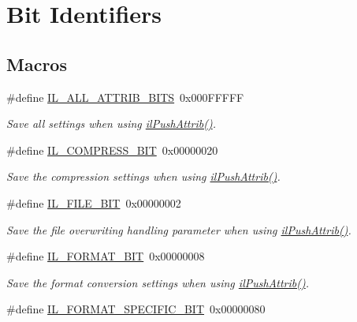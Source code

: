 \hypertarget{group__il__bits}{\section{Bit Identifiers}
\label{group__il__bits}
}
\subsection*{Macros}
\begin{DoxyCompactItemize}
\item 
\#define \hyperlink{group__il__bits_ga7e0d7d1e541cc94a58709ca8fe2924c1}{I\+L\+\_\+\+A\+L\+L\+\_\+\+A\+T\+T\+R\+I\+B\+\_\+\+B\+I\+T\+S}~0x000\+F\+F\+F\+F\+F
\begin{DoxyCompactList}\small\item\em Save all settings when using \hyperlink{group__state_ga72e0879c71f59f06c35d2e2a10191fa8}{il\+Push\+Attrib()}. \end{DoxyCompactList}\item 
\#define \hyperlink{group__il__bits_ga5b13962d3eddb7fdc8274fcb77e2853a}{I\+L\+\_\+\+C\+O\+M\+P\+R\+E\+S\+S\+\_\+\+B\+I\+T}~0x00000020
\begin{DoxyCompactList}\small\item\em Save the compression settings when using \hyperlink{group__state_ga72e0879c71f59f06c35d2e2a10191fa8}{il\+Push\+Attrib()}. \end{DoxyCompactList}\item 
\#define \hyperlink{group__il__bits_ga7372508cfb8193d144e82b117a9bf603}{I\+L\+\_\+\+F\+I\+L\+E\+\_\+\+B\+I\+T}~0x00000002
\begin{DoxyCompactList}\small\item\em Save the file overwriting handling parameter when using \hyperlink{group__state_ga72e0879c71f59f06c35d2e2a10191fa8}{il\+Push\+Attrib()}. \end{DoxyCompactList}\item 
\#define \hyperlink{group__il__bits_gaf7ab93385f9420ef2d016a99525a84a4}{I\+L\+\_\+\+F\+O\+R\+M\+A\+T\+\_\+\+B\+I\+T}~0x00000008
\begin{DoxyCompactList}\small\item\em Save the format conversion settings when using \hyperlink{group__state_ga72e0879c71f59f06c35d2e2a10191fa8}{il\+Push\+Attrib()}. \end{DoxyCompactList}\item 
\#define \hyperlink{group__il__bits_ga9125bfe8022a62dbe57cf71f28075c2b}{I\+L\+\_\+\+F\+O\+R\+M\+A\+T\+\_\+\+S\+P\+E\+C\+I\+F\+I\+C\+\_\+\+B\+I\+T}~0x00000080

\end{DoxyCompactItemize}
